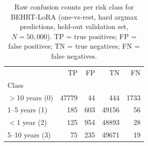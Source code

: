 \documentclass{article}
\begin{document}
\begin{table}
\caption{Raw confusion counts per risk class for BEHRT-LoRA, XGBoost, and Neural Network 
(one-vs-rest, hard argmax predictions), grouped by clinical risk category. 
BEHRT-LoRA evaluated on a stratified 50K subsample; XGBoost and NN on the full test set ($N=1{,}217{,}479$).}
\label{tab:confusion_counts_comparison}
\end{table}


\begin{table}
\caption{Raw confusion counts per risk class for BEHRT-LoRA (one-vs-rest, hard argmax predictions, held-out validation set, $N=50{,}000$). TP = true positives; FP = false positives; TN = true negatives; FN = false negatives.}
\label{tab:confusion_counts}
\begin{tabular}{lrrrr}
\toprule
 & TP & FP & TN & FN \\
Class &  &  &  &  \\
\midrule
$>$10 years (0) & 47779 & 44 & 444 & 1733 \\
1–5 years (1) & 185 & 603 & 49156 & 56 \\
$<$1 year (2) & 125 & 954 & 48893 & 28 \\
5–10 years (3) & 75 & 235 & 49671 & 19 \\
\bottomrule
\end{tabular}
\end{table}
\end{document}

